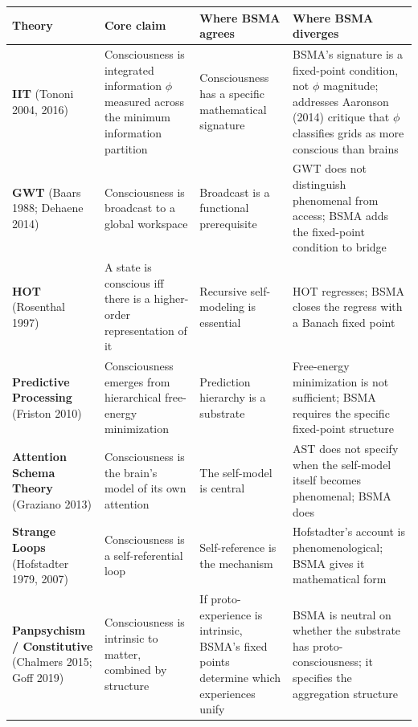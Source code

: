 \documentclass[
  11pt,
  a4paper,
]{article}
\begin{document}
\begin{longtable}[]{@{}
  >{\raggedright\arraybackslash}p{}
  >{\raggedright\arraybackslash}p{}
  >{\raggedright\arraybackslash}p{}
  >{\raggedright\arraybackslash}p{}@{}}
\toprule\noalign{}
\begin{minipage}[b]{\linewidth}\raggedright
Theory
\end{minipage} & \begin{minipage}[b]{\linewidth}\raggedright
Core claim
\end{minipage} & \begin{minipage}[b]{\linewidth}\raggedright
Where BSMA agrees
\end{minipage} & \begin{minipage}[b]{\linewidth}\raggedright
Where BSMA diverges
\end{minipage} \\
\midrule\noalign{}
\endhead
\bottomrule\noalign{}
\endlastfoot
\textbf{IIT} (Tononi 2004, 2016) & Consciousness is integrated
information \(\phi\) measured across the minimum information partition &
Consciousness has a specific mathematical signature & BSMA's signature
is a fixed-point condition, not \(\phi\) magnitude; addresses Aaronson
(2014) critique that \(\phi\) classifies grids as more conscious than
brains \\
\textbf{GWT} (Baars 1988; Dehaene 2014) & Consciousness is broadcast to
a global workspace & Broadcast is a functional prerequisite & GWT does
not distinguish phenomenal from access; BSMA adds the fixed-point
condition to bridge \\
\textbf{HOT} (Rosenthal 1997) & A state is conscious iff there is a
higher-order representation of it & Recursive self-modeling is essential
& HOT regresses; BSMA closes the regress with a Banach fixed point \\
\textbf{Predictive Processing} (Friston 2010) & Consciousness emerges
from hierarchical free-energy minimization & Prediction hierarchy is a
substrate & Free-energy minimization is not sufficient; BSMA requires
the specific fixed-point structure \\
\textbf{Attention Schema Theory} (Graziano 2013) & Consciousness is the
brain's model of its own attention & The self-model is central & AST
does not specify when the self-model itself becomes phenomenal; BSMA
does \\
\textbf{Strange Loops} (Hofstadter 1979, 2007) & Consciousness is a
self-referential loop & Self-reference is the mechanism & Hofstadter's
account is phenomenological; BSMA gives it mathematical form \\
\textbf{Panpsychism / Constitutive} (Chalmers 2015; Goff 2019) &
Consciousness is intrinsic to matter, combined by structure & If
proto-experience is intrinsic, BSMA's fixed points determine which
experiences unify & BSMA is neutral on whether the substrate has
proto-consciousness; it specifies the aggregation structure \\
\end{longtable}
\end{document}
